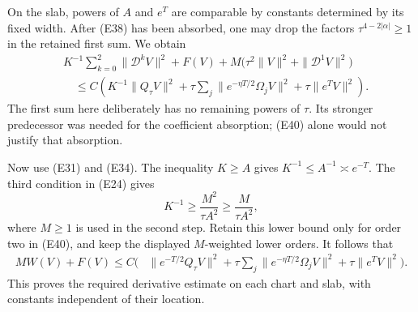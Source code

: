 \documentclass[
  11pt,
]{article}
\makeatletter
\let\ReaderOriginalAnchorStart\hyper@anchorstart
\let\ReaderOriginalAnchorEnd\hyper@anchorend
\let\ReaderPendingAliases\@empty
\def\ReaderArmAliases#1{\gdef\ReaderPendingAliases{#1}}
\def\hyper@anchorstart#1{\ReaderIfNativeAnchorTF{#1}{\ReaderPendingAliases\global\let\ReaderPendingAliases\@empty}{}\ReaderOriginalAnchorStart{#1}}
\makeatother
\begin{document}
On the slab, powers of \(A\) and \(e^T\) are comparable by constants
determined by its fixed width. After (E38) has been absorbed, one may
drop the factors \(\tau^{4-2|\alpha|}\geq1\) in the retained first sum.
We obtain \[
\begin{split}
 &K^{-1}\sum_{k=0}^2\|\mathcal D^kV\|^2+F(V)
                    +M\bigl(\tau^2\|V\|^2+\|\mathcal D^1V\|^2\bigr)\\
 &\quad\leq C\left(K^{-1}\|Q_\tau V\|^2
       +\tau\sum_j\|e^{-\eta T/2}\Omega_jV\|^2
       +\tau\|e^TV\|^2\right).
\end{split}                                                       \tag{E40}
\] The first sum here deliberately has no remaining powers of \(\tau\).
Its stronger predecessor was needed for the coefficient absorption;
(E40) alone would not justify that absorption.

Now use (E31) and (E34). The inequality \(K\geq A\) gives
\(K^{-1}\leq A^{-1}\asymp e^{-T}\). The third condition in (E24) gives
\[
             K^{-1}\geq\frac{M^2}{\tau A^2}
                         \geq\frac{M}{\tau A^2},               \tag{E41}
\] where \(M\geq1\) is used in the second step. Retain this lower bound
only for order two in (E40), and keep the displayed \(M\)-weighted lower
orders. It follows that \[
\begin{split}
 M W(V)+F(V)\leq C\bigg(&\|e^{-T/2}Q_\tau V\|^2
       +\tau\sum_j\|e^{-\eta T/2}\Omega_jV\|^2
       +\tau\|e^TV\|^2\bigg).
\end{split}                                                       \tag{E42}
\] This proves the required derivative estimate on each chart and slab,
with constants independent of their location.

\ReaderArmAliases{\ReaderOriginalAnchorStart{AN03-EXU-007}\ReaderOriginalAnchorEnd\begingroup\expandafter\def\csname @currentHref\endcsname{AN03-EXU-007}\label{AN03-EXU-007}\endgroup\ReaderOriginalAnchorStart{an03-exu-007-localization-with-constants-independent-of-support}\ReaderOriginalAnchorEnd\begingroup\expandafter\def\csname @currentHref\endcsname{an03-exu-007-localization-with-constants-independent-of-support}\label{an03-exu-007-localization-with-constants-independent-of-support}\endgroup\ReaderOriginalAnchorStart{7-localization-with-constants-independent-of-support}\ReaderOriginalAnchorEnd\begingroup\expandafter\def\csname @currentHref\endcsname{7-localization-with-constants-independent-of-support}\label{7-localization-with-constants-independent-of-support}\endgroup\ReaderOriginalAnchorStart{localization-with-constants-independent-of-support}\ReaderOriginalAnchorEnd}
\end{document}
